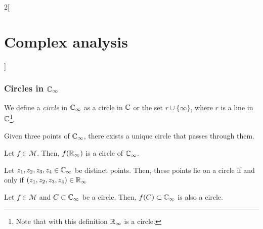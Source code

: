 \documentclass[../../../main_math.tex]{subfiles}
\begin{document}
\begin{multicols}{2}[\section{Complex analysis}]
  \subsubsection{Circles in \texorpdfstring{$\mathbb{C}_\infty$}{Coo}}
  \begin{definition}
    We define a \emph{circle} in $\mathbb{C}_\infty$ as a circle in $\mathbb{C}$ or the set $r\cup\{\infty\}$, where $r$ is a line in $\mathbb{C}$\footnote{Note that with this definition $\mathbb{R}_\infty$ is a circle.}.
  \end{definition}
  \begin{proposition}
    Given three points of $\mathbb{C}_\infty$, there exists a unique circle that passes through them.
  \end{proposition}
  \begin{proposition}
    Let $f\in\mathcal{M}$. Then, $f(\mathbb{R}_\infty)$ is a circle of $\mathbb{C}_\infty$.
  \end{proposition}
  \begin{proposition}
    Let $z_1,z_2,z_3,z_4\in\mathbb{C}_\infty$ be distinct points. Then, these points lie on a circle if and only if $(z_1,z_2,z_3,z_4)\in\mathbb{R}_\infty$
  \end{proposition}
  \begin{theorem}
    Let $f\in\mathcal{M}$ and $C\subset\mathbb{C}_\infty$ be a circle. Then, $f(C)\subset\mathbb{C}_\infty$ is also a circle.
  \end{theorem}

\end{multicols}
\end{document}
